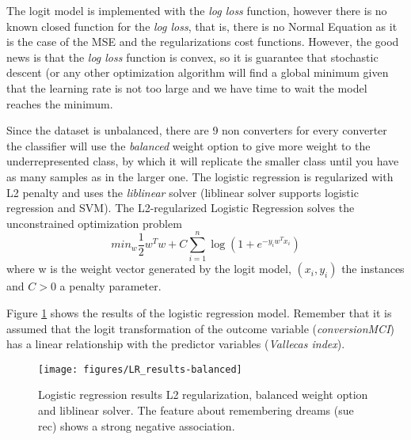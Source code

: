 \documentclass[11pt]{article}
\begin{document}
The logit model is implemented with the \emph{log loss} function, however there is no known closed function for the \emph{log loss}, that is, there is no Normal Equation as it is the case of the MSE and the regularizations cost functions. However, the good news is that the \emph{log loss} function is convex, so it is guarantee that stochastic descent (or any other optimization algorithm will find a global minimum given that the learning rate is not too large and we have time to wait the model reaches the minimum.

Since the dataset is unbalanced, there are 9 non converters for every converter the classifier will use the \emph{balanced} weight option to give more weight to the underrepresented class, by which it will replicate the smaller class until you have as many samples as in the larger one. 
The logistic regression is regularized with L2 penalty and uses the \emph{liblinear} solver (liblinear solver supports logistic regression and SVM). 
The L2-regularized Logistic Regression solves the unconstrained optimization problem \cite{fan2008liblinear}
\begin{equation}
\textit{min}_{w} \frac{1}{2}w^Tw + C \sum_{i=1}^{n}\log(1+ e^{-y_iw^Tx_i})
\end{equation}
where w is the weight vector generated by the logit model, $(x_i,y_i)$ the instances and $C > 0$ a penalty parameter.

Figure \ref{fig:logresres} shows the results of the logistic regression model. Remember that it is assumed that the logit transformation of the outcome variable (\emph{conversionMCI}) has a linear relationship with the predictor variables (\emph{Vallecas index}).


\begin{figure}[h]
        \centering
        \texttt{[image: figures/LR\_results-balanced]}
        \caption{Logistic regression results L2 regularization, balanced weight option and liblinear solver. The feature about remembering dreams (sue rec) shows a strong negative association.}
\label{fig:logresres}
\end{figure}


\end{document}
